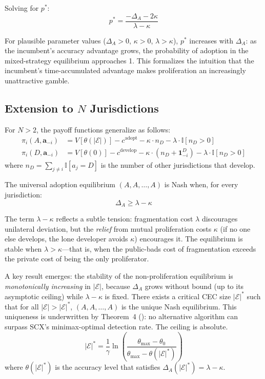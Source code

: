 \documentclass[12pt,a4paper]{article}
\theoremstyle{definition}
\theoremstyle{remark}
\begin{document}
Solving for $p^*$:
\begin{equation}
p^* = \frac{-\Delta_A - 2\kappa}{\lambda - \kappa}
\end{equation}

For plausible parameter values ($\Delta_A > 0$, $\kappa > 0$, $\lambda > \kappa$), $p^*$ increases with $\Delta_A$: as the incumbent's accuracy advantage grows, the probability of adoption in the mixed-strategy equilibrium approaches 1. This formalizes the intuition that the incumbent's time-accumulated advantage makes proliferation an increasingly unattractive gamble.

\subsection{Extension to $N$ Jurisdictions}

For $N > 2$, the payoff functions generalize as follows:
\begin{align}
\pi_i(A, \mathbf{a}_{-i}) &= V[\theta(|\mathcal{E}|)] - c^{\text{adopt}} - \kappa \cdot n_D - \lambda \cdot \mathbb{I}[n_D > 0] \\
\pi_i(D, \mathbf{a}_{-i}) &= V[\theta(0)] - c^{\text{develop}} - \kappa \cdot (n_D + \mathbf{1}_{-i}^D) - \lambda \cdot \mathbb{I}[n_D > 0]
\end{align}
where $n_D = \sum_{j \neq i} \mathbb{I}[a_j = D]$ is the number of other jurisdictions that develop.

The universal adoption equilibrium $(A, A, \ldots, A)$ is Nash when, for every jurisdiction:
\begin{equation}
\Delta_A \geq \lambda - \kappa
\end{equation}

The term $\lambda - \kappa$ reflects a subtle tension: fragmentation cost $\lambda$ discourages unilateral deviation, but the \textit{relief} from mutual proliferation costs $\kappa$ (if no one else develops, the lone developer avoids $\kappa$) encourages it. The equilibrium is stable when $\lambda > \kappa$—that is, when the public-bads cost of fragmentation exceeds the private cost of being the only proliferator.

A key result emerges: the stability of the non-proliferation equilibrium is \textit{monotonically increasing} in $|\mathcal{E}|$, because $\Delta_A$ grows without bound (up to its asymptotic ceiling) while $\lambda - \kappa$ is fixed. There exists a critical CEC size $|\mathcal{E}|^*$ such that for all $|\mathcal{E}| > |\mathcal{E}|^*$, $(A, A, \ldots, A)$ is the unique Nash equilibrium. This uniqueness is underwritten by Theorem~4 (): no alternative algorithm can surpass SCX's minimax-optimal detection rate. The ceiling is absolute.
\begin{equation}
|\mathcal{E}|^* = \frac{1}{\gamma} \ln\left( \frac{\theta_{\max} - \theta_0}{\theta_{\max} - \theta(|\mathcal{E}|^*)} \right)
\end{equation}
where $\theta(|\mathcal{E}|^*)$ is the accuracy level that satisfies $\Delta_A(|\mathcal{E}|^*) = \lambda - \kappa$.
\end{document}
